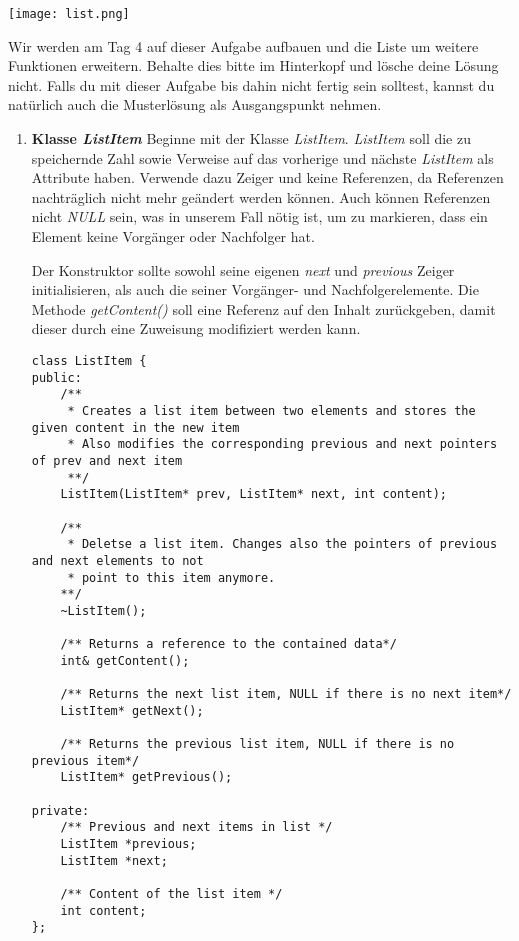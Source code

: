 \documentclass[
  accentcolor=tud1c,	%
  colorbacktitle,		%
  inverttitle,			%
  german,				%
  twoside
]{tudexercise}
\begin{document}
\begin{center}
	\texttt{[image: list.png]}
\end{center}

Wir werden am Tag 4 auf dieser Aufgabe aufbauen und die Liste um weitere Funktionen erweitern.
Behalte dies bitte im Hinterkopf und lösche deine Lösung nicht.
Falls du mit dieser Aufgabe bis dahin nicht fertig sein solltest, kannst du natürlich auch die Musterlösung als Ausgangspunkt nehmen.

\begin{enumerate}
\item \textbf{Klasse \emph{ListItem}}
Beginne mit der Klasse \emph{ListItem}. 
\emph{ListItem} soll die zu speichernde Zahl sowie Verweise auf das vorherige und nächste \emph{ListItem} als Attribute haben.
Verwende dazu Zeiger und keine Referenzen, da Referenzen nachträglich nicht mehr geändert werden können.
Auch können Referenzen nicht \emph{NULL} sein, was in unserem Fall nötig ist, um zu markieren, dass ein Element keine Vorgänger oder Nachfolger hat.

Der Konstruktor sollte sowohl seine eigenen \emph{next} und \emph{previous} Zeiger initialisieren, als auch die seiner Vorgänger- und Nachfolgerelemente. 
Die Methode \emph{getContent()} soll eine Referenz auf den Inhalt zurückgeben, damit dieser durch eine Zuweisung modifiziert werden kann.

\begin{lstlisting}
class ListItem {
public:
	/** 
	 * Creates a list item between two elements and stores the given content in the new item
	 * Also modifies the corresponding previous and next pointers of prev and next item
	 **/
	ListItem(ListItem* prev, ListItem* next, int content);

	/** 
	 * Deletse a list item. Changes also the pointers of previous and next elements to not
	 * point to this item anymore.
	**/
	~ListItem();

	/** Returns a reference to the contained data*/
	int& getContent();

	/** Returns the next list item, NULL if there is no next item*/
	ListItem* getNext();

	/** Returns the previous list item, NULL if there is no previous item*/
	ListItem* getPrevious();

private:
	/** Previous and next items in list */
	ListItem *previous;
	ListItem *next;

	/** Content of the list item */
	int content;
};
\end{lstlisting}


\end{enumerate}
\end{document}
